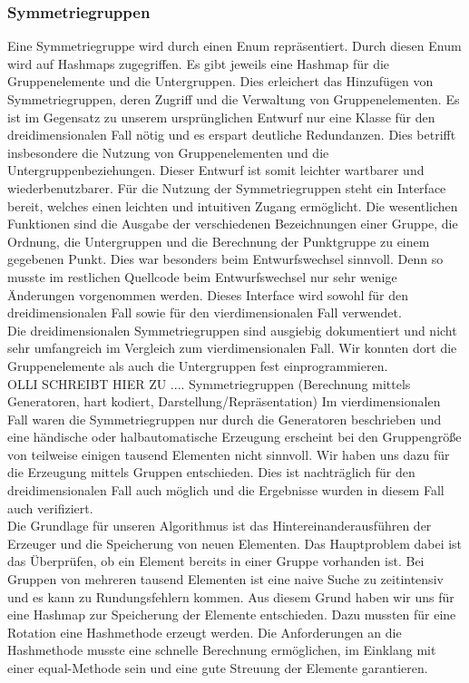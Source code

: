     \subsubsection{Symmetriegruppen}
    Eine Symmetriegruppe wird durch einen Enum repräsentiert. Durch diesen Enum wird auf Hashmaps zugegriffen. Es gibt jeweils eine Hashmap für die Gruppenelemente und die Untergruppen. Dies erleichert das Hinzufügen von Symmetriegruppen, deren Zugriff und die Verwaltung von Gruppenelementen. Es ist im Gegensatz zu unserem ursprünglichen Entwurf nur eine Klasse für den dreidimensionalen Fall nötig und es erspart deutliche Redundanzen. Dies betrifft insbesondere die Nutzung von Gruppenelementen und die Untergruppenbeziehungen. Dieser Entwurf ist somit leichter wartbarer und wiederbenutzbarer.
    Für die Nutzung der Symmetriegruppen steht ein Interface bereit, welches einen leichten und intuitiven Zugang ermöglicht. Die wesentlichen Funktionen sind die Ausgabe der verschiedenen Bezeichnungen einer Gruppe, die Ordnung, die Untergruppen und die Berechnung der Punktgruppe zu einem gegebenen Punkt. Dies war besonders beim Entwurfswechsel sinnvoll. Denn so musste im restlichen Quellcode beim Entwurfswechsel nur sehr wenige Änderungen vorgenommen werden. Dieses Interface wird sowohl für den dreidimensionalen Fall sowie für den vierdimensionalen Fall verwendet.\\ 
    Die dreidimensionalen Symmetriegruppen sind ausgiebig dokumentiert und nicht sehr umfangreich im Vergleich zum vierdimensionalen Fall. Wir konnten dort die Gruppenelemente als auch die Untergruppen fest einprogrammieren.  \\
        OLLI SCHREIBT HIER ZU .... Symmetriegruppen (Berechnung mittels Generatoren, hart kodiert, Darstellung/Repräsentation)
Im vierdimensionalen Fall waren die Symmetriegruppen nur durch die Generatoren beschrieben und eine händische oder halbautomatische Erzeugung erscheint bei den Gruppengröße von teilweise einigen tausend Elementen nicht sinnvoll. Wir haben uns dazu für die Erzeugung mittels Gruppen entschieden. Dies ist nachträglich für den dreidimensionalen Fall auch möglich und die Ergebnisse wurden in diesem Fall auch verifiziert.\\
Die Grundlage für unseren Algorithmus ist das Hintereinanderausführen der Erzeuger und die Speicherung von neuen Elementen. Das Hauptproblem dabei ist das Überprüfen, ob ein Element bereits in einer Gruppe vorhanden ist. Bei Gruppen von mehreren tausend Elementen ist eine naive Suche zu zeitintensiv und es kann zu Rundungsfehlern kommen. Aus diesem Grund haben wir uns für eine Hashmap zur Speicherung der Elemente entschieden. Dazu mussten für eine Rotation eine Hashmethode erzeugt werden. Die Anforderungen an die Hashmethode musste eine schnelle Berechnung ermöglichen, im Einklang mit einer equal-Methode sein und eine gute Streuung der Elemente garantieren.
